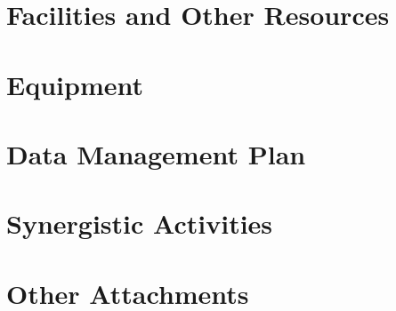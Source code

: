 \documentclass[11pt]{article}
\begin{document}
\thispagestyle{empty}
\AddToShipoutPicture*{\BackgroundPic}


\clearpage
\ifdefined\tocflag
\thispagestyle{empty}
\tableofcontents
\clearpage
\fi
{}

\thispagestyle{fancy}
\setlength{\headheight}{19.7478pt}
\setlength{\headsep}{4pt}
\newlength{\nsfoffset}
\setlength{\nsfoffset}{\headheight}
\addtolength{\nsfoffset}{\baselineskip}



\clearpage
\appendix


\clearpage

\section{Facilities and Other Resources}\label{sec:facilities}


\section{Equipment}\label{sec:equipment}


\clearpage
\section{Data Management Plan}\label{sec:dataplan}


\clearpage
\section{Synergistic Activities}\label{sec:synergy}



\clearpage
\section{Other Attachments}\label{sec:other}

\end{document}
